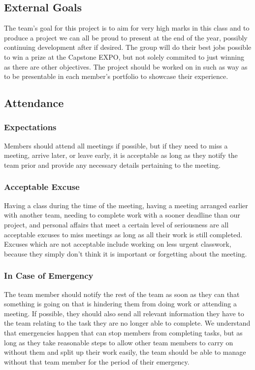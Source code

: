 \subsection*{External Goals}

The team’s goal for this project is to aim for very high marks in this class and to produce a project we can all be proud to present at the end of the year, possibly continuing development after if desired. The group will do their best jobs possible to win a prize at the Capstone EXPO, but not solely commited to just winning as there are other objectives.
The project should be worked on in such as way as to be presentable in each member's portfolio to showcase their experience.

\subsection*{Attendance}

\subsubsection*{Expectations}

Members should attend all meetings if possible, but if they need to miss a meeting, arrive later, or leave early, it is acceptable as long as they notify the team prior and provide any necessary details pertaining to the meeting.

\subsubsection*{Acceptable Excuse}

Having a class during the time of the meeting, having a meeting arranged earlier with another team, needing to complete work with a sooner deadline than our project, and personal affairs that meet a certain level of seriousness are all acceptable excuses to miss meetings as long as all their work is still completed. Excuses which are not acceptable include working on less urgent classwork, because they simply don’t think it is important or forgetting about the meeting.

\subsubsection*{In Case of Emergency}

The team member should notify the rest of the team as soon as they can that something is going on that is hindering them from doing work or attending a meeting. If possible, they should also send all relevant information they have to the team relating to the task they are no longer able to complete. We understand that emergencies happen that can stop members from completing tasks, but as long as they take reasonable steps to allow other team members to carry on without them and split up their work easily, the team should be able to manage without that team member for the period of their emergency.

